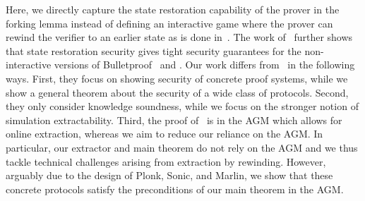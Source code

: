 Here, we directly capture the state restoration capability of the prover in the forking lemma instead of defining an interactive game where the prover can rewind the verifier to an earlier state as is done in~\cite{C:GhoTes21}. 
The work of~\cite{C:GhoTes21} further shows that state restoration security gives tight security guarantees for the
non-interactive versions of Bulletproof~\cite{SP:BBBPWM18} and \sonic. 
Our work differs from~\cite{C:GhoTes21} in the following ways. First, they
focus on showing security of concrete proof systems, while we show
a general theorem about the security of a wide class of protocols. 
Second, they only consider knowledge soundness, while we focus on the stronger notion of simulation extractability. Third, the proof of~\cite{C:GhoTes21} is in the AGM which allows for online extraction, whereas we aim to reduce our reliance on the AGM. In particular, our extractor and main theorem do not rely on the AGM and we thus tackle technical challenges arising from extraction by rewinding.
However, arguably due to the design of Plonk, Sonic, and Marlin, we show that these concrete protocols satisfy the preconditions of our main theorem in the AGM.

